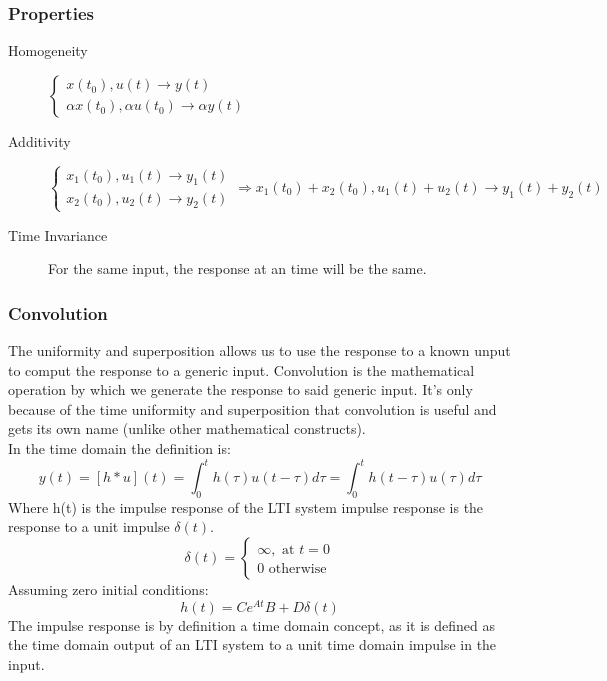 \documentclass[../notes.tex]{subfiles}
\begin{document}
\subsubsection{Properties}
\begin{description}
    \item[Homogeneity] $\begin{cases*}
        x(t_0), u(t) \rightarrow y(t) \\
        \alpha x(t_0), \alpha u(t_0) \rightarrow \alpha y(t)
    \end{cases*}$
    \item[Additivity] $\begin{cases*}
        x_1(t_0), u_1(t) \rightarrow y_1(t) \\
        x_2(t_0), u_2(t) \rightarrow y_2(t)
    \end{cases*} \Rightarrow x_1(t_0) + x_2(t_0), u_1(t) + u_2(t) \rightarrow y_1(t) + y_2(t)$
    \item[Time Invariance] For the same input, the response at an time will be the same.
\end{description}

\subsubsection{Convolution}
The uniformity and superposition allows us to use the response to a known unput to comput the response to a generic input. Convolution is the mathematical operation  by which we generate the response to said generic input. It's only because of the time uniformity and superposition that convolution is useful and gets its own name (unlike other mathematical constructs). \\
In the time domain the definition is:
\begin{equation}
    y(t) = [h*u](t) = \int_{0}^{t}h(\tau)u(t-\tau)d\tau = \int_{0}^{t}h(t-\tau)u(\tau)d\tau
\end{equation}
Where h(t) is the impulse response of the LTI system impulse response is the response to a unit impulse $\delta(t)$.
\begin{equation}
    \delta(t) = \begin{cases}
        \infty, \text{ at } t=0 \\
        0 \text{ otherwise}
    \end{cases}
\end{equation}
Assuming zero initial conditions:
\begin{equation*}
    h(t) = Ce^{At}B + D\delta(t)
\end{equation*}
The impulse response is by definition a time domain concept, as it is defined as the time domain output of an LTI system to a unit time domain impulse in the input.
\end{document}
